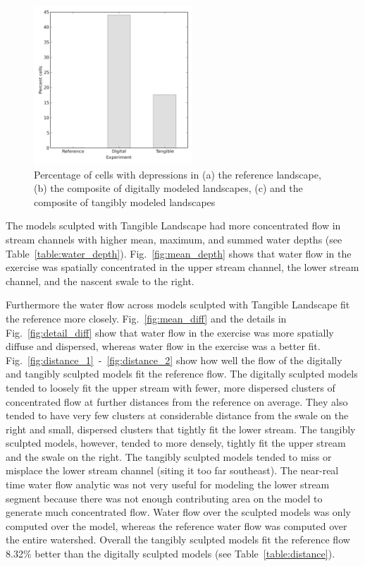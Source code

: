 \documentclass{isprs}
\begin{document}
\begin{figure}[ht!]
\begin{center}
\includegraphics[width=225px]{figures/depression_cells.png}
\caption{Percentage of cells with depressions in (a) the reference landscape, (b) the composite of digitally modeled landscapes, (c) and the composite of tangibly modeled landscapes}
\label{fig:depression_plot}
\end{center}
\end{figure}

The models sculpted with Tangible Landscape 
had more concentrated flow in stream channels
with higher 
mean, maximum, and 
summed water depths
(see Table~\ref{table:water_depth}).
%
Fig.~\ref{fig:mean_depth}
shows that water flow in the  exercise was
spatially concentrated 
in the upper stream channel, 
the lower stream channel, 
and the nascent swale to the right.

Furthermore the water flow across models sculpted with Tangible Landscape fit the reference more closely.
Fig.~\ref{fig:mean_diff} and the details in Fig.~\ref{fig:detail_diff} 
show that water flow in the  exercise was more spatially diffuse and dispersed, 
whereas water flow in the  exercise was a better fit. %
%
Fig.~\ref{fig:distance_1}~-~\ref{fig:distance_2} 
show how well the flow of the digitally and tangibly sculpted models fit the reference flow. 
%
The digitally sculpted models tended to loosely fit the upper stream with fewer, more dispersed clusters of concentrated flow at further distances from the reference on average. They also tended to have very few clusters at considerable distance from the swale on the right and small, dispersed clusters that tightly fit the lower stream. 
%
The tangibly sculpted models, however, tended to more densely, tightly fit the upper stream and the swale on the right. 
The tangibly sculpted models tended to miss or misplace the lower stream channel (siting it too far southeast). 
The near-real time water flow analytic was not very useful for modeling the lower stream segment because there was not enough contributing area on the model to generate much concentrated flow. 
Water flow over the sculpted models was only computed over the model, 
whereas the reference water flow was computed over the entire watershed. 
%
Overall the tangibly sculpted models fit the reference flow 8.32\% better than the digitally sculpted models (see Table~\ref{table:distance}).
\end{document}
